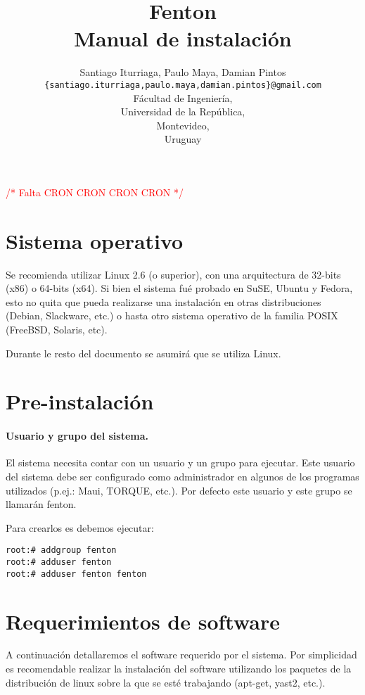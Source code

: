 \documentclass[a4paper,10pt,spanish]{article}
\title{Fenton\\Manual de instalaci\'{o}n}
\author{Santiago Iturriaga, Paulo Maya, Damian Pintos\\
\texttt{\{santiago.iturriaga,paulo.maya,damian.pintos\}@gmail.com}\\
F\'{a}cultad de Ingenier\'{i}a,\\
Universidad de la Rep\'{u}blica,\\
Montevideo,\\
Uruguay}
\date{}
\begin{document}
\maketitle
\tableofcontents{}

\textcolor{red}{\Large /{*} Falta CRON CRON CRON CRON {*}/}

\section{Sistema operativo}

Se recomienda utilizar Linux 2.6 (o superior), con una arquitectura de 32-bits (x86) o 64-bits (x64). Si bien el sistema fu\'{e} probado en SuSE, Ubuntu y Fedora, esto no quita que pueda realizarse una instalaci\'{o}n en otras distribuciones (Debian, Slackware, etc.) o hasta otro sistema operativo de la familia POSIX (FreeBSD, Solaris, etc).

Durante le resto del documento se asumir\'{a} que se utiliza Linux.

\section{Pre-instalaci\'{o}n}

\paragraph{Usuario y grupo del sistema.}

El sistema necesita contar con un usuario y un grupo para ejecutar. Este usuario del sistema debe ser configurado como administrador en algunos de los programas utilizados (p.ej.: Maui, TORQUE, etc.). Por defecto este usuario y este grupo se llamar\'{a}n fenton.

Para crearlos es debemos ejecutar:

\begin{verbatim}
root:# addgroup fenton
root:# adduser fenton
root:# adduser fenton fenton
\end{verbatim}

\section{Requerimientos de software}

A continuaci\'{o}n detallaremos el software requerido por el sistema. Por simplicidad es recomendable realizar la instalaci\'{o}n del software utilizando los paquetes de la distribuci\'{o}n de linux sobre la que se est\'{e} trabajando (apt-get, yast2, etc.).
\end{document}
